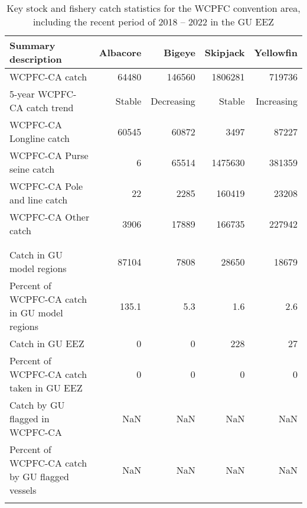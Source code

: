 \begin{longtable}{lrrrr}
\caption{Key stock and fishery catch statistics for the WCPFC convention area, including the recent period of 2018 -- 2022 in the GU EEZ} \\ 
  \hline
Summary description & Albacore & Bigeye & Skipjack & Yellowfin \\ 
  \hline
WCPFC-CA catch & 64480 & 146560 & 1806281 & 719736 \\ 
  5-year WCPFC-CA catch trend & Stable & Decreasing & Stable & Increasing \\ 
  WCPFC-CA Longline catch & 60545 & 60872 & 3497 & 87227 \\ 
  WCPFC-CA Purse seine catch & 6 & 65514 & 1475630 & 381359 \\ 
  WCPFC-CA Pole and line catch & 22 & 2285 & 160419 & 23208 \\ 
  WCPFC-CA Other catch & 3906 & 17889 & 166735 & 227942 \\ 
   &  &  &  &  \\ 
   \hline
 &  &  &  &  \\ 
  Catch in GU model regions & 87104 & 7808 & 28650 & 18679 \\ 
  Percent of WCPFC-CA catch in GU model regions & 135.1 & 5.3 & 1.6 & 2.6 \\ 
  Catch in GU EEZ & 0 & 0 & 228 & 27 \\ 
  Percent of WCPFC-CA catch taken in GU EEZ & 0 & 0 & 0 & 0 \\ 
  Catch by GU flagged in WCPFC-CA & NaN & NaN & NaN & NaN \\ 
  Percent of WCPFC-CA catch by GU flagged vessels & NaN & NaN & NaN & NaN \\ 
  \hline
\label{cat_sum_tab}
\end{longtable}
